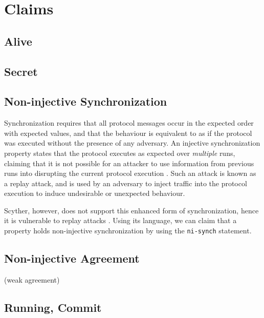 \section{Claims}



\subsection{Alive}

\subsection{Secret}




\subsection{Non-injective Synchronization}

Synchronization requires that all protocol messages occur in the expected order with expected values, and that the behaviour is equivalent to as if the protocol was executed without the presence of any adversary. An injective synchronization property states that the protocol executes as expected over \emph{multiple} runs, claiming that it is not possible for an attacker to use information from previous runs into disrupting the current protocol execution \cite{cremers2005operational}. Such an attack is known as a replay attack, and is used by an adversary to inject traffic into the protocol execution to induce undesirable or unexpected behaviour.

Scyther, however, does not support this enhanced form of synchronization, hence it is vulnerable to replay attacks \cite{cremers2008scyther}. Using its language, we can claim that a property holds non-injective synchronization by using the \texttt{ni-synch} statement.





\subsection{Non-injective Agreement}

(weak agreement)


\subsection{Running, Commit}





